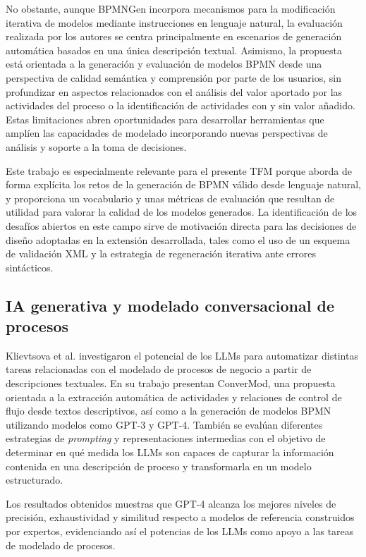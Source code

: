 No obstante, aunque BPMNGen incorpora mecanismos para la modificación iterativa de modelos mediante 
instrucciones en lenguaje natural, la evaluación realizada por los autores se centra principalmente 
en escenarios de generación automática basados en una única descripción textual. 
Asimismo, la propuesta está orientada a la generación y evaluación de modelos BPMN desde una perspectiva de calidad semántica 
y comprensión por parte de los usuarios, sin profundizar en aspectos relacionados con el análisis del valor aportado por las 
actividades del proceso o la identificación de actividades con y sin valor añadido. Estas limitaciones abren oportunidades 
para desarrollar herramientas que amplíen las capacidades de modelado incorporando nuevas perspectivas de análisis y soporte 
a la toma de decisiones.

Este trabajo es especialmente relevante para el presente TFM porque aborda de forma explícita los retos de la generación 
de BPMN válido desde lenguaje natural, y proporciona un vocabulario y unas métricas de evaluación que resultan 
de utilidad para valorar la calidad de los modelos generados. La identificación de los desafíos abiertos
en este campo sirve de motivación directa para las decisiones de diseño adoptadas en la extensión desarrollada, 
tales como el uso de un esquema de validación XML y la estrategia de regeneración iterativa ante errores sintácticos.
\subsection{IA generativa y modelado conversacional de procesos}

Klievtsova et al. \cite{abb2023} investigaron el potencial de los LLMs para automatizar distintas tareas relacionadas con el modelado de procesos de 
negocio a partir de descripciones textuales. En su trabajo presentan ConverMod, una propuesta orientada a la extracción automática de actividades 
y relaciones de control de flujo desde textos descriptivos, así como a la generación de modelos BPMN utilizando modelos como 
GPT-3 y GPT-4. También se evalúan diferentes estrategias de \textit{prompting} y representaciones intermedias con el objetivo
de determinar en qué medida los LLMs son capaces de capturar la información contenida en una descripción de proceso
y transformarla en un modelo estructurado. 

Los resultados obtenidos muestras que GPT-4 alcanza los mejores niveles de precisión, exhaustividad y similitud respecto a modelos 
de referencia construidos por expertos, evidenciando así el potencias de los LLMs como apoyo a las tareas de modelado de procesos.  


